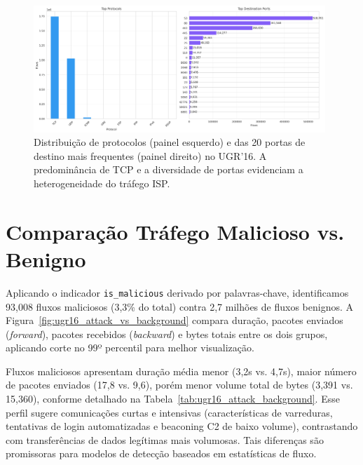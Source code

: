 \documentclass[a4paper, 12pt]{article}
\begin{document}
\begin{figure}[H]
    \centering
    \includegraphics[width=0.98\textwidth]{ugr16_protocol_port_profiles.png}
    \caption{Distribuição de protocolos (painel esquerdo) e das 20 portas de destino mais frequentes (painel direito) no UGR'16. A predominância de TCP e a diversidade de portas evidenciam a heterogeneidade do tráfego ISP.}
    \label{fig:ugr16_protocol_port_profiles}
\end{figure}




\section{Comparação Tráfego Malicioso vs. Benigno}
Aplicando o indicador \texttt{is\_malicious} derivado por palavras-chave, identificamos 93{,}008 fluxos maliciosos (3{,}3\% do total) contra 2{,}7 milhões de fluxos benignos. A Figura~\ref{fig:ugr16_attack_vs_background} compara duração, pacotes enviados (\textit{forward}), pacotes recebidos (\textit{backward}) e bytes totais entre os dois grupos, aplicando corte no 99º percentil para melhor visualização.

Fluxos maliciosos apresentam duração média menor (3{,}2s vs. 4{,}7s), maior número de pacotes enviados (17{,}8 vs. 9{,}6), porém menor volume total de bytes (3{,}391 vs. 15{,}360), conforme detalhado na Tabela~\ref{tab:ugr16_attack_background}. Esse perfil sugere comunicações curtas e intensivas (características de varreduras, tentativas de login automatizadas e beaconing C2 de baixo volume), contrastando com transferências de dados legítimas mais volumosas. Tais diferenças são promissoras para modelos de detecção baseados em estatísticas de fluxo.
\end{document}
